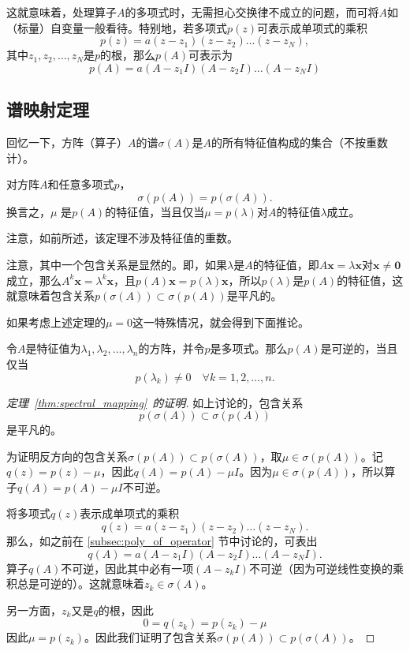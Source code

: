 这就意味着，处理算子$A$的多项式时，无需担心交换律不成立的问题，而可将$A$如（标量）自变量一般看待。特别地，若多项式$p(z)$可表示成单项式的乘积\[p(z)=a(z-z_1)(z-z_2)\ldots(z-z_N),\]
其中$z_1,z_2,\dots,z_N$是$p$的根，那么$p(A)$可表示为\[p(A)=a(A-z_1 I)(A-z_2 I)\ldots(A-z_N I)\]

\subsection{谱映射定理}

回忆一下，方阵（算子）$A$的谱$\sigma(A)$是$A$的所有特征值构成的集合（不按重数计）。

\begin{theorem}[谱映射定理]\label{thm:spectral_mapping}
    对方阵$A$和任意多项式$p$，\[\sigma(p(A))=p(\sigma(A)).\]
    换言之，$\mu$ 是$p(A)$的特征值，当且仅当$\mu=p(\lambda)$对$A$的特征值$\lambda$成立。
\end{theorem}

注意，如前所述，该定理不涉及特征值的重数。

\begin{remark*}
    注意，其中一个包含关系是显然的。即，如果$\lambda$是$A$的特征值，即$A\mathbf{x}=\lambda\mathbf{x}$对$\mathbf{x}\ne \mathbf{0}$成立，那么$A^k\mathbf{x}=\lambda^k\mathbf{x}$，且$p(A)\mathbf{x}=p(\lambda)\mathbf{x}$，所以$p(\lambda)$是$p(A)$的特征值，这就意味着包含关系$p(\sigma(A))\subset \sigma(p(A))$是平凡的。
\end{remark*}

如果考虑上述定理的$\mu=0$这一特殊情况，就会得到下面推论。

\begin{corollary}\label{cor:poly_invertible}
    令$A$是特征值为$\lambda_1,\lambda_2,\dots,\lambda_n$的方阵，并令$p$是多项式。那么$p(A)$是可逆的，当且仅当\[p(\lambda_k)\ne 0\quad \forall k=1,2,\dots,n.\]
\end{corollary}

\begin{proof}[定理~\ref{thm:spectral_mapping}~的证明]
    如上讨论的，包含关系\[p(\sigma(A))\subset \sigma(p(A))\]是平凡的。

    为证明反方向的包含关系$\sigma(p(A))\subset p(\sigma(A))$，取$\mu\in \sigma(p(A))$。记$q(z)=p(z)-\mu$，因此$q(A)=p(A)-\mu I$。因为$\mu\in \sigma(p(A))$，所以算子$q(A)=p(A)-\mu I$不可逆。

    将多项式$q(z)$表示成单项式的乘积\[q(z)=a(z-z_1)(z-z_2)\dots (z-z_N).\]
    那么，如之前在 \ref{subsec:poly_of_operator} 节中讨论的，可表出
    \[q(A)=a(A-z_1 I)(A-z_2 I)\dots (A-z_N I).\]
    算子$q(A)$不可逆，因此其中必有一项$(A-z_k I)$不可逆（因为可逆线性变换的乘积总是可逆的）。这就意味着$z_k\in\sigma(A)$。

    另一方面，$z_k$又是$q$的根，因此\[0=q(z_k)=p(z_k)-\mu\]因此$\mu=p(z_k)$。因此我们证明了包含关系$\sigma(p(A))\subset p(\sigma(A))$。
\end{proof}

